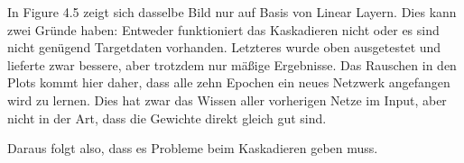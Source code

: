 In Figure 4.5 zeigt sich dasselbe Bild nur auf Basis von Linear Layern. Dies kann zwei Gründe haben: Entweder funktioniert das Kaskadieren nicht 
oder es sind nicht genügend Targetdaten vorhanden. Letzteres wurde oben ausgetestet und lieferte zwar bessere, aber trotzdem nur mäßige Ergebnisse. 
Das Rauschen in den Plots kommt hier daher, dass alle zehn Epochen ein neues Netzwerk angefangen wird zu lernen. Dies hat zwar das Wissen aller 
vorherigen Netze im Input, aber nicht in der Art, dass die Gewichte direkt gleich gut sind. 

Daraus folgt also, dass es Probleme beim Kaskadieren geben muss. 
